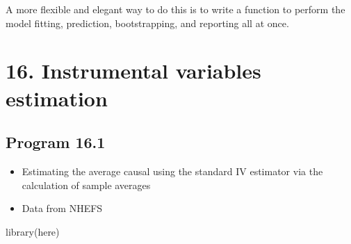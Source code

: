 \documentclass[
  10pt,
  a4paper,
]{book}
\newenvironment{Shaded}{\begin{snugshade}}{\end{snugshade}}
\newcommand{\FunctionTok}[1]{\textcolor[rgb]{0.28,0.35,0.67}{#1}}
\newcommand{\NormalTok}[1]{\textcolor[rgb]{0.00,0.46,0.62}{#1}}
\providecommand{\tightlist}{%
  \setlength{\itemsep}{0pt}\setlength{\parskip}{0pt}}
\begin{document}
A more flexible and elegant way to do this is to write a function to perform the model fitting, prediction, bootstrapping, and reporting all at once.

\chapter*{16. Instrumental variables estimation}\label{instrumental-variables-estimation}

\section{Program 16.1}\label{program-16.1}

\begin{itemize}
\tightlist
\item
  Estimating the average causal using the standard IV estimator via the calculation of sample averages
\item
  Data from NHEFS
\end{itemize}

\begin{Shaded}
\begin{Highlighting}[]
\FunctionTok{library}\NormalTok{(here)}
\end{Highlighting}
\end{Shaded}
\end{document}
